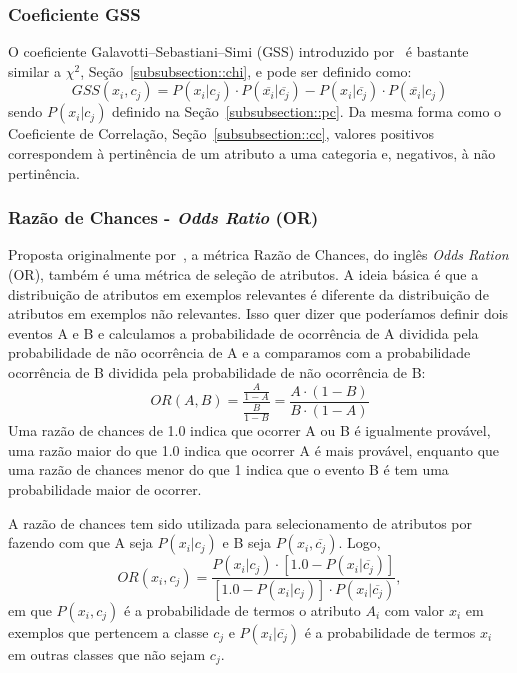 \subsubsection{Coeficiente GSS}
\label{subsubsection::gss}
O coeficiente Galavotti–Sebastiani–Simi (GSS) introduzido por~\cite{Galavotti00} é bastante similar a $\chi^2$, Seção~\ref{subsubsection::chi}, e pode ser definido como:
\begin{equation}\label{eqn::gss}
   GSS(x_i, c_j) = P(x_i|c_j) \cdot P(\overline{x_i}|\overline{c_j}) - P(x_i|\overline{c_j}) \cdot P(\overline{x_i}|c_j) 
\end{equation}
sendo $P(x_i|c_j)$ definido na Seção~\ref{subsubsection::pc}. Da mesma forma como o Coeficiente de Correlação, Seção~\ref{subsubsection::cc}, valores positivos correspondem à pertinência de um atributo a uma categoria e, negativos, à não pertinência. 


\subsubsection{Razão de Chances - \textit{Odds Ratio} (OR)}
\label{subsubsection::or}

Proposta originalmente por~\cite{Rijsbergen79}, a métrica Razão de Chances, do inglês \textit{Odds Ration} (OR), também é uma métrica de seleção de atributos. A ideia básica é que a distribuição de atributos em exemplos relevantes é diferente da distribuição de atributos em exemplos não relevantes. Isso quer dizer que poderíamos definir dois eventos A e B e calculamos a probabilidade de ocorrência de A dividida pela probabilidade de não ocorrência de A e a comparamos com a probabilidade ocorrência de B dividida pela probabilidade de não ocorrência de B:
\begin{equation}\label{eqn::or}
   OR(A, B) = \frac{\frac{A}{1-A}} {\frac{B}{1-B}} = \frac{ A \cdot ( 1 - B )} { B \cdot ( 1 - A ) } 
\end{equation}
Uma razão de chances de 1.0 indica que ocorrer A ou B é igualmente provável, uma razão maior do que 1.0 indica que ocorrer A é mais provável, enquanto que uma razão de chances menor do que 1 indica que o evento B é tem uma probabilidade maior de ocorrer.

A razão de chances tem sido utilizada para selecionamento de atributos por \cite{Mladenic98} fazendo com que A seja $P(x_i|c_j)$ e B seja $P(x_i,\overline{c_j})$. Logo,
\begin{equation}\label{eqn::or}
   OR(x_i, c_j) = \frac{ P(x_i|c_j) \cdot [ 1.0 - P(x_i|\overline{c_j}) ] }{ [ 1.0 - P(x_i|c_j) ] \cdot P(x_i|\overline{c_j})},
\end{equation}
em que $P(x_i, c_j)$ é a probabilidade de termos o atributo $A_i$ com valor $x_i$ em exemplos que pertencem a classe $c_j$ e $P(x_i|\overline{c_j})$ é a probabilidade de termos $x_i$ em outras classes que não sejam $c_j$.

